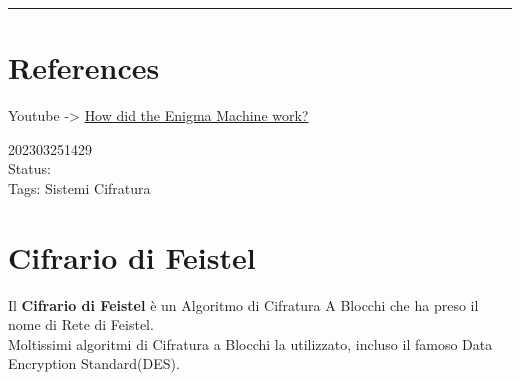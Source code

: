 \documentclass[
]{article}
\begin{document}
\begin{center}\rule{0.5\linewidth}{0.5pt}\end{center}

\hypertarget{references-12}{%
\section{References}\label{references-12}}

Youtube -\textgreater{}
\href{https://www.youtube.com/watch?v=ybkkiGtJmkM}{How did the Enigma
Machine work?}

202303251429\\
Status:\\
Tags: Sistemi Cifratura

\hypertarget{cifrario-di-feistel}{%
\section{Cifrario di Feistel}\label{cifrario-di-feistel}}

Il \textbf{Cifrario di Feistel} è un Algoritmo di Cifratura A Blocchi
che ha preso il nome di Rete di Feistel.\\
Moltissimi algoritmi di Cifratura a Blocchi la utilizzato, incluso il
famoso Data Encryption Standard(DES).
\end{document}
